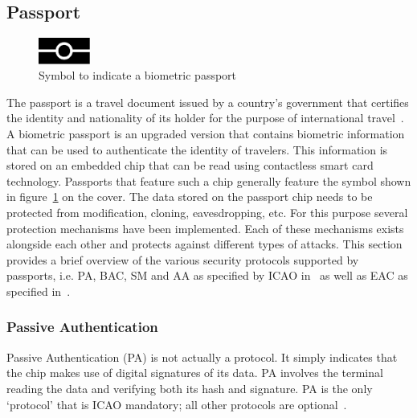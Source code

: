 \subsection{Passport}
\label{subsec:passports}
\begin{figure}
  \centering
	\includegraphics[width=0.15\textwidth]{images/biometrics_logo.pdf}
	\caption{Symbol to indicate a biometric passport}
	\label{fig:biometricslogo}
\end{figure}
The passport is a travel document issued by a country's government that certifies the identity and nationality of its holder for the purpose of international travel~\cite{passportdefinition}. A biometric passport is an upgraded version that contains biometric information that can be used to authenticate the identity of travelers. This information is stored on an embedded chip that can be read using contactless smart card technology. Passports that feature such a chip generally feature the symbol shown in figure~\ref{fig:biometricslogo} on the cover. The data stored on the passport chip needs to be protected from modification, cloning, eavesdropping, etc. For this purpose several protection mechanisms have been implemented. Each of these mechanisms exists alongside each other and protects against different types of attacks. This section provides a brief overview of the various security protocols supported by passports, i.e. PA, BAC, SM and AA as specified by ICAO in~\cite{icao} as well as EAC as specified in~\cite{bsi}. 

\subsubsection{Passive Authentication}
\label{subsubsec:pa}
Passive Authentication (PA) is not actually a protocol. It simply indicates that the chip makes use of digital signatures of its data. PA involves the terminal reading the data and verifying both its hash and signature. PA is the only `protocol' that is ICAO mandatory; all other protocols are optional~\cite{mostowski2010electronic}.

